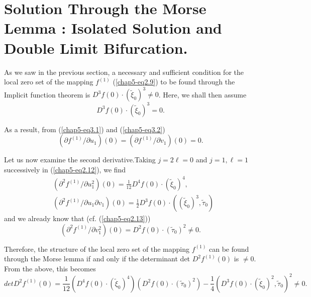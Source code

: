 \section[Solution Through the Morse Lemma....]{Solution Through the Morse Lemma : Isolated Solution and
  Double Limit Bifurcation.}\label{chap5-sec4} 

As we saw in the previous section, a necessary and sufficient
condition for the local zero set of the mapping $f^{(1)}$
(\ref{chap5-eq2.9}) to be found through the Implicit function theorem
is $D^{3}f(0) \cdot (\widetilde{\xi}_{0})^{3} \neq 0$.\pageoriginale
Here, we shall then assume
\begin{equation*}
D^{3}f(0) \cdot (\widetilde{\xi}_{0})^{3} = 0.\tag{4.1}\label{chap5-eq4.1}
\end{equation*}

As a result, from (\ref{chap5-eq3.1}) and (\ref{chap5-eq3.2})
\begin{equation*}
(\partial f^{(1)} / \partial u_{1})(0) = (\partial f^{(1)} / \partial
  v_{1})(0) = 0.\tag{4.2}\label{chap5-eq4.2}
\end{equation*}

Let us now examine the second derivative.Taking $j = 2 \ell = 0$ and
$j = 1, \ell = 1$ successively in (\ref{chap5-eq2.12}), we find
\begin{align*}
& (\partial^{2}f^{(1)} / \partial u_{1}^{2}) (0) = \frac{1}{12}
  D^{4}f(0) \cdot
  (\widetilde{\xi}_{0})^{4},\tag{4.3}\label{chap5-eq4.3}\\
& (\partial^{2}f^{(1)}/ \partial u_{1} \partial v_{1}) (0) =
  \frac{1}{2} D^{3}f(0) \cdot ((\widetilde{\xi}_{0})^{3},
  \widetilde{\tau}_{0})\tag{4.4}\label{chap5-eq4.4} 
\end{align*}
and we already know that (cf. (\ref{chap5-eq2.13}))
\begin{equation*}
(\partial^{2}f^{(1)} / \partial v_{1}^{2})(0) = D^{2}f(0) \cdot
  (\widetilde{\tau}_{0})^{2} \neq 0. \tag{4.5}\label{chap5-eq4.5}
\end{equation*}

Therefore, the structure of the local zero set of the mapping
$f^{(1)}$ can be found through the Morse lemma if and only if the
determinant det $D^{2}f^{(1)}(0)$ is $\neq 0$. From the above, this
becomes
{\fontsize{10}{12}\selectfont
\begin{equation*}
det D^{2}f^{(1)}(0) = \frac{1}{12} (D^{4} f(0) \cdot
(\widetilde{\xi}_{0})^{4}) (D^{2}f(0) \cdot
(\widetilde{\tau}_{0})^{2}) - \frac{1}{4} (D^{3}f(0) \cdot
(\widetilde{\xi}_{0})^{2}, \widetilde{\tau}_{0})^{2} \neq 0. \tag{4.6}\label{chap5-eq4.6}
\end{equation*}}

